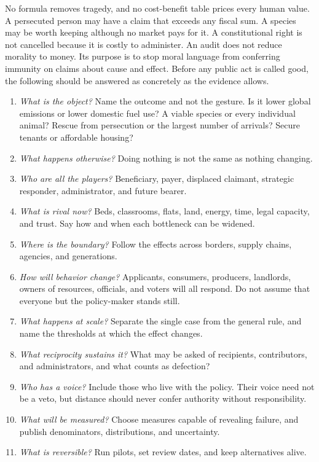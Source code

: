\documentclass[12pt,a4paper]{book}
\begin{document}
No formula removes tragedy, and no cost-benefit table prices every human value. A persecuted person may have a claim that exceeds any fiscal sum. A species may be worth keeping although no market pays for it. A constitutional right is not cancelled because it is costly to administer. An audit does not reduce morality to money. Its purpose is to stop moral language from conferring immunity on claims about cause and effect. Before any public act is called good, the following should be answered as concretely as the evidence allows.

\begin{enumerate}
\item \emph{What is the object?} Name the outcome and not the gesture. Is it lower global emissions or lower domestic fuel use? A viable species or every individual animal? Rescue from persecution or the largest number of arrivals? Secure tenants or affordable housing?
\item \emph{What happens otherwise?} Doing nothing is not the same as nothing changing.
\item \emph{Who are all the players?} Beneficiary, payer, displaced claimant, strategic responder, administrator, and future bearer.
\item \emph{What is rival now?} Beds, classrooms, flats, land, energy, time, legal capacity, and trust. Say how and when each bottleneck can be widened.
\item \emph{Where is the boundary?} Follow the effects across borders, supply chains, agencies, and generations.
\item \emph{How will behavior change?} Applicants, consumers, producers, landlords, owners of resources, officials, and voters will all respond. Do not assume that everyone but the policy-maker stands still.
\item \emph{What happens at scale?} Separate the single case from the general rule, and name the thresholds at which the effect changes.
\item \emph{What reciprocity sustains it?} What may be asked of recipients, contributors, and administrators, and what counts as defection?
\item \emph{Who has a voice?} Include those who live with the policy. Their voice need not be a veto, but distance should never confer authority without responsibility.
\item \emph{What will be measured?} Choose measures capable of revealing failure, and publish denominators, distributions, and uncertainty.
\item \emph{What is reversible?} Run pilots, set review dates, and keep alternatives alive.

\end{enumerate}
\end{document}
